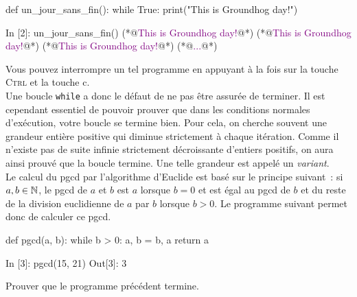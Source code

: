 \documentclass{magnolia}
\begin{document}
\begin{pythoncodeline}
def un_jour_sans_fin():
    while True:
        print("This is Groundhog day!")
\end{pythoncodeline}

\begin{pythoncode}
In [2]: un_jour_sans_fin()
(*@\textcolor{purple}{This is Groundhog day!}@*)
(*@\textcolor{purple}{This is Groundhog day!}@*)
(*@\textcolor{purple}{This is Groundhog day!}@*)
(*@\textcolor{purple}{...}@*)
\end{pythoncode}
\noindent Vous pouvez interrompre un tel programme en appuyant à la fois sur la touche \og \textsc{Ctrl} \fg et la touche \og c\fg.\\

Une boucle \verb_while_ a donc le défaut de ne pas être assurée de terminer. Il est
cependant essentiel de pouvoir prouver que dans les conditions normales d'exécution, votre boucle se termine bien. Pour cela,
on cherche souvent une grandeur entière positive qui diminue strictement à chaque itération. Comme
il n'existe pas de suite infinie strictement décroissante d'entiers positifs, on aura
ainsi prouvé que la boucle termine. Une telle grandeur est appelé un \emph{variant}.\\

Le calcul du pgcd par l'algorithme d'Euclide est basé sur le principe suivant~:
si $a,b\in\mathbb{N}$, le pgcd de $a$ et $b$ est $a$ lorsque $b=0$ et est égal au pgcd de
$b$ et du reste de la division euclidienne de $a$ par $b$ lorsque $b>0$. Le programme
suivant permet donc de calculer ce pgcd.

\begin{pythoncodeline}
def pgcd(a, b):
    while b > 0:
        a, b = b, a %
    return a
\end{pythoncodeline}

\begin{pythoncode}
In [3]: pgcd(15, 21)
Out[3]: 3
\end{pythoncode}

\begin{exoUnique}
\exo Prouver que le programme précédent termine.
\end{exoUnique}

\end{document}
